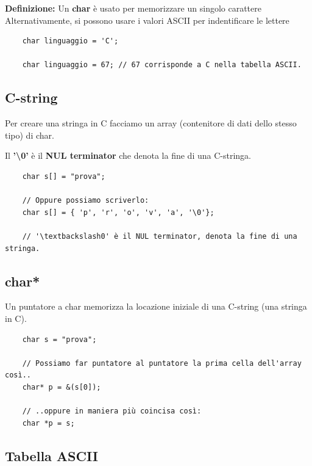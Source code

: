 \textsf{\small \textbf{Definizione: } Un \textbf{char} è usato per memorizzare un singolo carattere} \\

\textsf{\small Alternativamente, si possono usare i valori ASCII per indentificare le lettere} \\

\begin{lstlisting}
	char linguaggio = 'C';
	
	char linguaggio = 67; // 67 corrisponde a C nella tabella ASCII.
\end{lstlisting}

\subsection{C-string}

\textsf{\small Per creare una stringa in C facciamo un array (contenitore di dati dello stesso tipo) di char.}

\textsf{\small Il \textbf{'\textbackslash0'} è il \textbf{NUL terminator} che denota la fine di una C-stringa. } \\

\begin{lstlisting}
	char s[] = "prova";
	
	// Oppure possiamo scriverlo:
	char s[] = { 'p', 'r', 'o', 'v', 'a', '\0'};
	
	// '\textbackslash0' è il NUL terminator, denota la fine di una stringa.
\end{lstlisting}

\subsection{char*}

\textsf{\small Un puntatore a char memorizza la locazione iniziale di una C-string (una stringa in C). } \\

\begin{lstlisting}
	char s = "prova";
	
	// Possiamo far puntatore al puntatore la prima cella dell'array così..
	char* p = &(s[0]);
	
	// ..oppure in maniera più coincisa così:
	char *p = s;
\end{lstlisting}

\subsection{Tabella ASCII}

